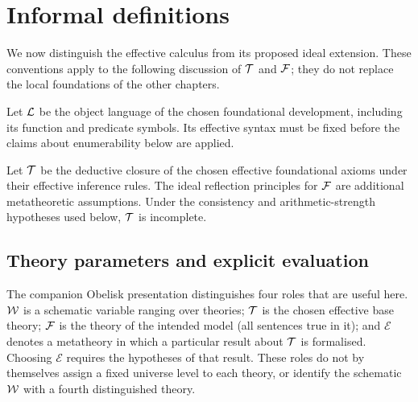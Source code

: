 \section{Informal definitions}
We now distinguish the effective calculus from its proposed ideal extension.
These conventions apply to the following discussion of $\mathcal{T}$ and ${\mathcal{F}}$;
they do not replace the local foundations of the other chapters.

\begin{definition*}%
Let ${\mathcal{L}}$ be the object language of the chosen foundational development,
including its function and predicate symbols. Its effective syntax must be
fixed before the claims about enumerability below are applied.%
\end{definition*}

\begin{definition*}%
Let $\mathcal{T}$ be the deductive closure of the chosen effective foundational
axioms under their effective inference rules. The ideal reflection principles
for ${\mathcal{F}}$ are additional metatheoretic assumptions. Under the consistency
and arithmetic-strength hypotheses used below, $\mathcal{T}$ is incomplete.
\end{definition*}

\subsection{Theory parameters and explicit evaluation}
The companion Obelisk presentation distinguishes four roles that are useful
here. ${\mathcal{W}}$ is a schematic variable ranging over theories; $\mathcal{T}$ is the
chosen effective base theory; ${\mathcal{F}}$ is the theory of the intended model
(all sentences true in it); and
$\mathcal{E}$ denotes a metatheory in which a particular result about
$\mathcal{T}$ is formalised. Choosing $\mathcal{E}$ requires the hypotheses of that
result. These roles do not by themselves assign a fixed universe level to
each theory, or identify the schematic ${\mathcal{W}}$ with a fourth distinguished
theory.


